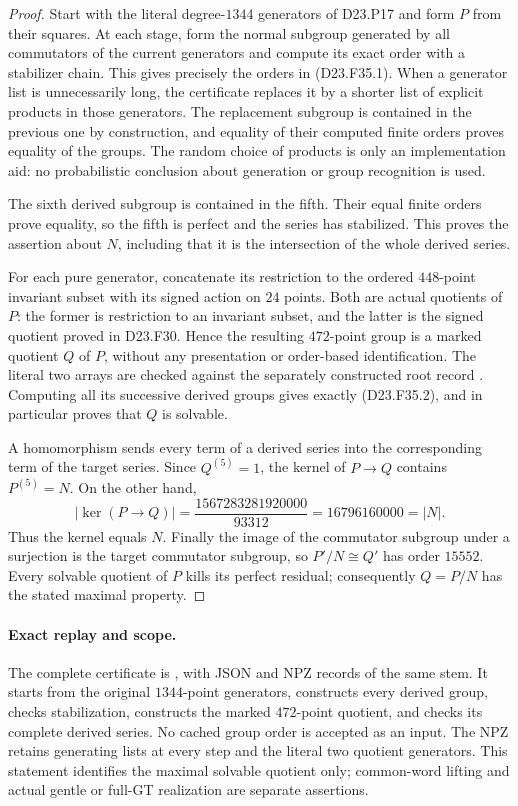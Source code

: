 \begin{proof}
Start with the literal degree-$1344$ generators of D23.P17 and form
$P$ from their squares. At each stage, form the normal subgroup
generated by all commutators of the current generators and compute
its exact order with a stabilizer chain. This gives precisely the
orders in (D23.F35.1). When a generator list is unnecessarily long,
the certificate replaces it by a shorter list of explicit products
in those generators. The replacement subgroup is contained in the
previous one by construction, and equality of their computed finite
orders proves equality of the groups. The random choice of products
is only an implementation aid: no probabilistic conclusion about
generation or group recognition is used.

The sixth derived subgroup is contained in the fifth. Their equal
finite orders prove equality, so the fifth is perfect and the series
has stabilized. This proves the assertion about $N$, including that
it is the intersection of the whole derived series.

For each pure generator, concatenate its restriction to the ordered
$448$-point invariant subset with its signed action on $24$ points.
Both are actual quotients of $P$: the former is restriction to an
invariant subset, and the latter is the signed quotient proved in
D23.F30. Hence the resulting $472$-point group is a marked quotient
$Q$ of $P$, without any presentation or order-based identification.
The literal two arrays are checked against the separately
constructed root record
.
Computing all its successive derived groups gives exactly
(D23.F35.2), and in particular proves that $Q$ is solvable.

A homomorphism sends every term of a derived series into the
corresponding term of the target series. Since $Q^{(5)}=1$, the
kernel of $P\to Q$ contains $P^{(5)}=N$. On the other hand,
\[
        |\ker(P\to Q)|=\frac{1567283281920000}{93312}
                      =16796160000=|N|.
\]
Thus the kernel equals $N$. Finally the image of the commutator
subgroup under a surjection is the target commutator subgroup,
so $P'/N\cong Q'$ has order $15552$. Every solvable quotient of
$P$ kills its perfect residual; consequently $Q=P/N$ has the stated
maximal property.
\end{proof}

\paragraph{Exact replay and scope.}
The complete certificate is
,
with JSON and NPZ records of the same stem. It starts from the
original $1344$-point generators, constructs every derived group,
checks stabilization, constructs the marked $472$-point quotient,
and checks its complete derived series. No cached group order is
accepted as an input. The NPZ retains generating lists at every
step and the literal two quotient generators. This statement
identifies the maximal solvable quotient only; common-word lifting
and actual gentle or full-GT realization are separate assertions.
